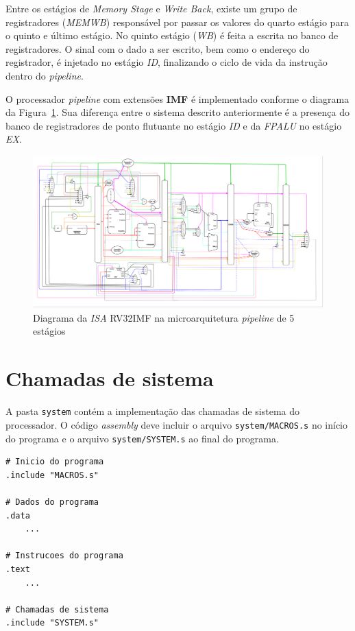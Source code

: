         { Entre os estágios de \textit{Memory Stage} e \textit{Write Back},
            existe um grupo de registradores (\textit{MEMWB}) responsável por passar
            os valores do quarto estágio para o quinto e último estágio. No quinto
            estágio (\textit{WB}) é feita a escrita no banco de registradores.
            O sinal com o dado a ser escrito, bem como o endereço do registrador,
            é injetado no estágio \textit{ID}, finalizando o ciclo de vida da
            instrução dentro do \textit{pipeline}.
        }

        { O processador \textit{pipeline} com extensões \textbf{IMF} é implementado
            conforme o diagrama da Figura~\ref{fig:diagram_rv32imf_pipe}. Sua
            diferença entre o sistema descrito anteriormente é a presença do
            banco de registradores de ponto flutuante no estágio \textit{ID} e
            da \textit{FPALU} no estágio \textit{EX}.
        }

        \begin{figure}[H]
        \centering
            \includegraphics[angle=90,width=1\textwidth,height=1\textheight,keepaspectratio]{../images/uarch_diagrams/pipeline-RV32IMF.png}
            \caption{Diagrama da \textit{ISA} RV32IMF na microarquitetura
                \textit{pipeline} de 5 estágios}\label{fig:diagram_rv32imf_pipe}
        \end{figure}

\section{Chamadas de sistema}
    { A pasta \texttt{system} contém a implementação das chamadas de sistema do
        processador. O código \textit{assembly} deve incluir o arquivo
        \texttt{system/MACROS.s} no início do programa e o arquivo
        \texttt{system/SYSTEM.s} ao final do programa.
    }
    \begin{lstlisting}
# Inicio do programa
.include "MACROS.s"

# Dados do programa
.data
    ...

# Instrucoes do programa
.text
    ...

# Chamadas de sistema
.include "SYSTEM.s"
    \end{lstlisting}

